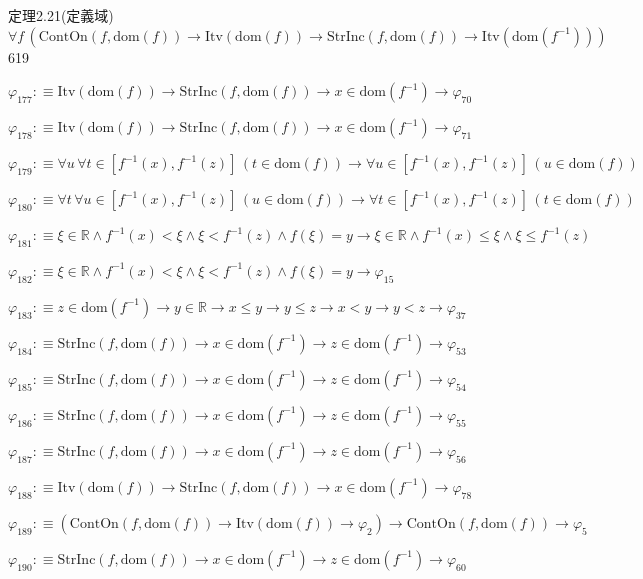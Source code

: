 \begin{fullproof}{定理2.21(定義域)}{$\forall f\,(\mathrm{ContOn}(f,\mathrm{dom}(f)) \to \mathrm{Itv}(\mathrm{dom}(f)) \to \mathrm{StrInc}(f,\mathrm{dom}(f)) \to \mathrm{Itv}(\mathrm{dom}(f^{-1})))$}{619}
\begin{abbrevlist}
\item $\varphi_{177} :\equiv \mathrm{Itv}(\mathrm{dom}(f)) \to \mathrm{StrInc}(f,\mathrm{dom}(f)) \to x \in \mathrm{dom}(f^{-1}) \to \varphi_{70}$
\item $\varphi_{178} :\equiv \mathrm{Itv}(\mathrm{dom}(f)) \to \mathrm{StrInc}(f,\mathrm{dom}(f)) \to x \in \mathrm{dom}(f^{-1}) \to \varphi_{71}$
\item $\varphi_{179} :\equiv \forall u\,\forall t \in [f^{-1}(x),f^{-1}(z)]\,(t \in \mathrm{dom}(f)) \to \forall u \in [f^{-1}(x),f^{-1}(z)]\,(u \in \mathrm{dom}(f))$
\item $\varphi_{180} :\equiv \forall t\,\forall u \in [f^{-1}(x),f^{-1}(z)]\,(u \in \mathrm{dom}(f)) \to \forall t \in [f^{-1}(x),f^{-1}(z)]\,(t \in \mathrm{dom}(f))$
\item $\varphi_{181} :\equiv \xi \in \mathbb{R} \land f^{-1}(x) < \xi \land \xi < f^{-1}(z) \land f(\xi) = y \to \xi \in \mathbb{R} \land f^{-1}(x) \leq \xi \land \xi \leq f^{-1}(z)$
\item $\varphi_{182} :\equiv \xi \in \mathbb{R} \land f^{-1}(x) < \xi \land \xi < f^{-1}(z) \land f(\xi) = y \to \varphi_{15}$
\item $\varphi_{183} :\equiv z \in \mathrm{dom}(f^{-1}) \to y \in \mathbb{R} \to x \leq y \to y \leq z \to x < y \to y < z \to \varphi_{37}$
\item $\varphi_{184} :\equiv \mathrm{StrInc}(f,\mathrm{dom}(f)) \to x \in \mathrm{dom}(f^{-1}) \to z \in \mathrm{dom}(f^{-1}) \to \varphi_{53}$
\item $\varphi_{185} :\equiv \mathrm{StrInc}(f,\mathrm{dom}(f)) \to x \in \mathrm{dom}(f^{-1}) \to z \in \mathrm{dom}(f^{-1}) \to \varphi_{54}$
\item $\varphi_{186} :\equiv \mathrm{StrInc}(f,\mathrm{dom}(f)) \to x \in \mathrm{dom}(f^{-1}) \to z \in \mathrm{dom}(f^{-1}) \to \varphi_{55}$
\item $\varphi_{187} :\equiv \mathrm{StrInc}(f,\mathrm{dom}(f)) \to x \in \mathrm{dom}(f^{-1}) \to z \in \mathrm{dom}(f^{-1}) \to \varphi_{56}$
\item $\varphi_{188} :\equiv \mathrm{Itv}(\mathrm{dom}(f)) \to \mathrm{StrInc}(f,\mathrm{dom}(f)) \to x \in \mathrm{dom}(f^{-1}) \to \varphi_{78}$
\item $\varphi_{189} :\equiv (\mathrm{ContOn}(f,\mathrm{dom}(f)) \to \mathrm{Itv}(\mathrm{dom}(f)) \to \varphi_{2}) \to \mathrm{ContOn}(f,\mathrm{dom}(f)) \to \varphi_{5}$
\item $\varphi_{190} :\equiv \mathrm{StrInc}(f,\mathrm{dom}(f)) \to x \in \mathrm{dom}(f^{-1}) \to z \in \mathrm{dom}(f^{-1}) \to \varphi_{60}$

\end{abbrevlist}
\end{fullproof}
